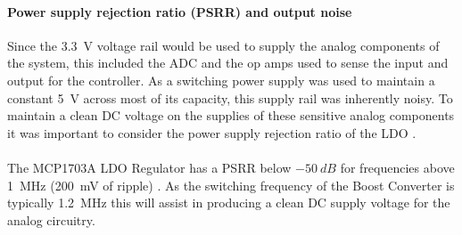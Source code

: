 \paragraph{Power supply rejection ratio (PSRR) and output noise}
Since the \SI{3.3}{V} voltage rail would be used to supply the analog components of the system, this included the ADC and the op amps used to sense the input and output for the controller. As a switching power supply was used to maintain a constant \SI{5}{V} across most of its capacity, this supply rail was inherently noisy. To maintain a clean DC voltage on the supplies of these sensitive analog components it was important to consider the power supply rejection ratio of the LDO \cite{supply_ripple}.
\\ \\
The MCP1703A LDO Regulator has a PSRR below $-\SI{50}{dB}$ for frequencies above \SI{1}{MHz} (\SI{200}{mV} of ripple) \cite{mcp1703a}. As the switching frequency of the Boost Converter is typically \SI{1.2}{MHz} this will assist in producing a clean DC supply voltage for the analog circuitry.
